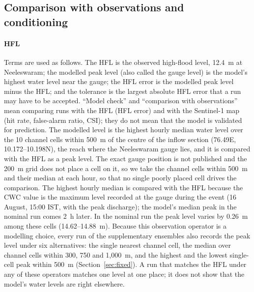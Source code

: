 \documentclass[preprint,12pt,authoryear]{elsarticle}
\begin{document}
\subsection{Comparison with observations and conditioning}
\label{sec:validation}
\paragraph{HFL} Terms are used as follows. The HFL is the observed high-flood level, 12.4~m at Neeleswaram; the modelled peak level (also called the gauge level) is the model's highest water level near the gauge; the HFL error is the modelled peak level minus the HFL; and the tolerance is the largest absolute HFL error that a run may have to be accepted. ``Model check'' and ``comparison with observations'' mean comparing runs with the HFL (HFL error) and with the Sentinel-1 map (hit rate, false-alarm ratio, CSI); they do not mean that the model is validated for prediction. The modelled level is the highest hourly median water level over the 10 channel cells within 500~m of the centre of the inflow section (76.49\textdegree E, 10.172--10.198\textdegree N), the reach where the Neeleswaram gauge lies, and it is compared with the HFL as a peak level. The exact gauge position is not published and the 200~m grid does not place a cell on it, so we take the channel cells within 500~m and their median at each hour, so that no single poorly placed cell drives the comparison. The highest hourly median is compared with the HFL because the CWC value is the maximum level recorded at the gauge during the event (16 August, 15:00 IST, with the peak discharge); the model's median peak in the nominal run comes 2~h later. In the nominal run the peak level varies by 0.26~m among these cells (14.62--14.88~m). Because this observation operator is a modelling choice, every run of the supplementary ensembles also records the peak level under six alternatives: the single nearest channel cell, the median over channel cells within 300, 750 and 1,000~m, and the highest and the lowest single-cell peak within 500~m (Section~\ref{sec:fixed}). A run that matches the HFL under any of these operators matches one level at one place; it does not show that the model's water levels are right elsewhere.
\end{document}
